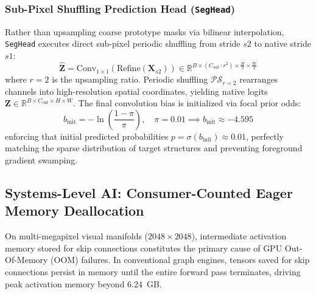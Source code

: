 \documentclass[11pt,a4paper]{article}
\begin{document}
\subsubsection{Sub-Pixel Shuffling Prediction Head (\texttt{SegHead})}
Rather than upsampling coarse prototype masks via bilinear interpolation, \texttt{SegHead} executes direct sub-pixel periodic shuffling from stride $s2$ to native stride $s1$:
\begin{equation}
\widehat{\mathbf{Z}} = \text{Conv}_{1\times 1}\left( \text{Refine}(\mathbf{X}_{s2}) \right) \in \mathbb{R}^{B \times (C_{\text{out}} \cdot r^2) \times \frac{H}{2} \times \frac{W}{2}}
\end{equation}
where $r=2$ is the upsampling ratio. Periodic shuffling $\mathcal{PS}_{r=2}$ rearranges channels into high-resolution spatial coordinates, yielding native logits $\mathbf{Z} \in \mathbb{R}^{B \times C_{\text{out}} \times H \times W}$. The final convolution bias is initialized via focal prior odds:
\begin{equation}
b_{\text{init}} = -\ln\left(\frac{1 - \pi}{\pi}\right), \quad \pi = 0.01 \implies b_{\text{init}} \approx -4.595
\end{equation}
enforcing that initial predicted probabilities $p = \sigma(b_{\text{init}}) \approx 0.01$, perfectly matching the sparse distribution of target structures and preventing foreground gradient swamping.

\subsection{Systems-Level AI: Consumer-Counted Eager Memory Deallocation}
On multi-megapixel visual manifolds ($2048\times 2048$), intermediate activation memory stored for skip connections constitutes the primary cause of GPU Out-Of-Memory (OOM) failures. In conventional graph engines, tensors saved for skip connections persist in memory until the entire forward pass terminates, driving peak activation memory beyond $6.24$~GB.
\end{document}
